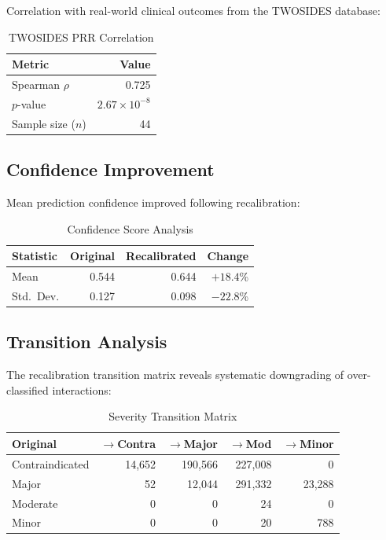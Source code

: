 \documentclass[11pt,a4paper]{article}
\begin{document}
Correlation with real-world clinical outcomes from the TWOSIDES database:

\begin{table}[H]
\centering
\caption{TWOSIDES PRR Correlation}
\label{tab:twosides}
\begin{tabular}{@{}lr@{}}
\toprule
\textbf{Metric} & \textbf{Value} \\
\midrule
Spearman $\rho$ & 0.725 \\
$p$-value & $2.67 \times 10^{-8}$ \\
Sample size ($n$) & 44 \\
\bottomrule
\end{tabular}
\end{table}

\subsection{Confidence Improvement}

Mean prediction confidence improved following recalibration:

\begin{table}[H]
\centering
\caption{Confidence Score Analysis}
\label{tab:confidence}
\begin{tabular}{@{}lrrr@{}}
\toprule
\textbf{Statistic} & \textbf{Original} & \textbf{Recalibrated} & \textbf{Change} \\
\midrule
Mean & 0.544 & 0.644 & $+18.4$\% \\
Std.\ Dev. & 0.127 & 0.098 & $-22.8$\% \\
\bottomrule
\end{tabular}
\end{table}

\subsection{Transition Analysis}

The recalibration transition matrix reveals systematic downgrading of over-classified interactions:

\begin{table}[H]
\centering
\caption{Severity Transition Matrix}
\label{tab:transition}
\begin{tabular}{@{}lrrrr@{}}
\toprule
\textbf{Original} & \textbf{$\to$Contra} & \textbf{$\to$Major} & \textbf{$\to$Mod} & \textbf{$\to$Minor} \\
\midrule
Contraindicated & 14,652 & 190,566 & 227,008 & 0 \\
Major & 52 & 12,044 & 291,332 & 23,288 \\
Moderate & 0 & 0 & 24 & 0 \\
Minor & 0 & 0 & 20 & 788 \\
\bottomrule
\end{tabular}
\end{table}
\end{document}
